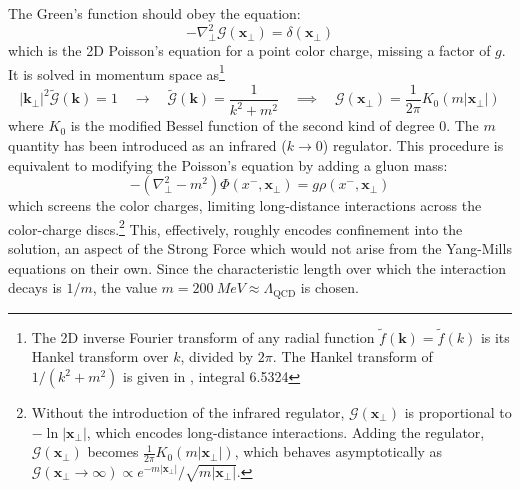 The Green's function should obey the equation:
\begin{equation}
	 - \nabla_\perp^2 \mathcal{G} (\mathbf{x}_\perp) = \delta (\mathbf{x}_\perp)
\end{equation}
which is the 2D Poisson's equation for a point color charge, missing a factor of $g$. It is solved in momentum space as\footnote{The 2D inverse Fourier transform of any radial function $\tilde{f}(\mathbf{k}) = \tilde{f}(k)$ is its Hankel transform over $k$, divided by $2 \pi$. The Hankel transform of $1/(k^2 + m^2)$ is given in \cite{Gradshteyn:1943cpj}, integral 6.5324}
\begin{equation}
	 | \mathbf{k}_\perp|^2 \tilde{\mathcal{G}}(\mathbf{k}) = 1 \quad \to \quad \tilde{\mathcal{G}}(\mathbf{k}) = \frac{1}{k^2+m^2} \quad \implies \quad \mathcal{G} (\mathbf{x}_\perp) = \frac{1}{2\pi} K_0 (m |\mathbf{x}_\perp|)
\end{equation}
where $K_0$ is the modified Bessel function of the second kind of degree $0$. The $m$ quantity has been introduced as an infrared ($k \to 0 $) regulator. This procedure is equivalent to modifying the Poisson's equation by adding a gluon mass:
\begin{equation}
	- (\nabla^2_\perp - m^2) \Phi(x^-, \mathbf{x}_\perp) = g \rho (x^-,\mathbf{x}_\perp)
\end{equation}
which screens the color charges, limiting long-distance interactions across the color-charge discs.\footnote{Without the introduction of the infrared regulator, $\mathcal{G}(\mathbf{x}_\perp)$ is proportional to $-\ln |\mathbf{x}_\perp|$, which encodes long-distance interactions. Adding the regulator, $\mathcal{G}(\mathbf{x}_\perp)$ becomes $\frac{1}{2\pi} K_0 (m |\mathbf{x}_\perp|)$, which behaves asymptotically as $\mathcal{G}(\mathbf{x}_\perp \to \infty) \propto e^{-m |\mathbf{x}_\perp|} / \sqrt{m |\mathbf{x}_\perp|}$.} This, effectively, roughly encodes confinement into the solution, an aspect of the Strong Force which would not arise from the Yang-Mills equations on their own. \cite{Carrington_2022,Guerrero_Rodr_guez_2021} Since the characteristic length over which the interaction decays is $1/m$, the value $m = \qty{200}{MeV} \approx \Lambda_{\text{QCD}}$ is chosen.

